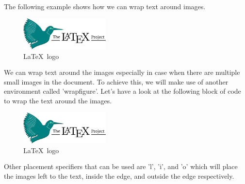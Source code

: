 \documentclass[12pt, letter]{article}
\begin{document}
The following example shows how we can wrap text around images.

\medskip

\begin{figure} %
	\centering
	\includegraphics[width=0.4\textwidth]{latex-logo}
	\caption{\LaTeX\ logo}
	\label{logo4}
\end{figure}

We can wrap text around the images especially in case when there are multiple small images in the document. To achieve this, we will make use of another environment called 'wrapfigure'. Let's have a look at the following block of code to wrap the text around the images.

\begin{figure}
	\centering
	\includegraphics[width=0.4\textwidth]{latex-logo}
	\caption{\LaTeX\ logo}
	\label{logo5}
\end{figure}

Other placement specifiers that can be used are 'l', 'i', and 'o' which will place the images left to the text, inside the edge, and outside the edge respectively.
\end{document}

